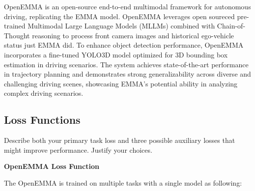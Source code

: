 \documentclass{article} %
\begin{document}
	OpenEMMA is an open-source end-to-end multimodal framework for autonomous driving, replicating the EMMA model. OpenEMMA leverages open soureced pre-trained Multimodal Large Language Models (MLLMs) combined with Chain-of-Thought reasoning to process front camera images and historical ego-vehicle status just EMMA did. To enhance object detection performance, OpenEMMA incorporates a fine-tuned YOLO3D model optimized for 3D bounding box estimation in driving scenarios. The system achieves state-of-the-art performance in trajectory planning and demonstrates strong generalizability across diverse and challenging driving scenes, showcasing EMMA’s potential ability in analyzing complex driving scenarios.
	
	
	
	
	\subsection{ Loss Functions }
	Describe both your primary task loss and three possible auxiliary losses that might improve performance.  Justify your choices.
	
	\textbf{OpenEMMA Loss Function}
	
	The OpenEMMA is trained on  multiple tasks with a single model as following:
	
\end{document}
